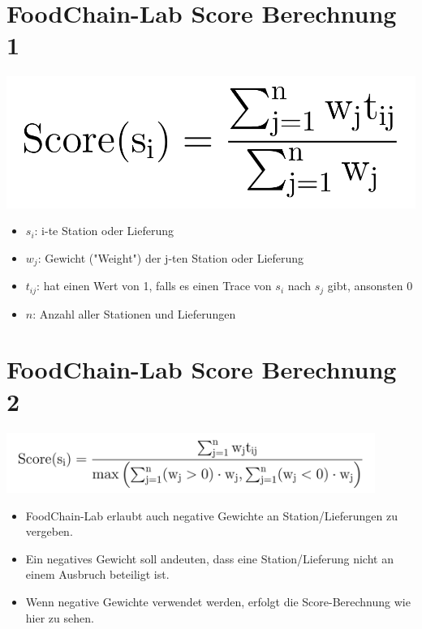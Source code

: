 \documentclass{beamer}
\begin{document}
\section{FoodChain-Lab Score Berechnung 1}
\begin{frame}
	\begin{center}
  		\includegraphics[height=0.3\textheight]{score.png}
	\end{center}
	\begin{itemize}
		\item $s_i$: i-te Station oder Lieferung
		\item $w_j$: Gewicht ("Weight") der j-ten Station oder Lieferung
		\item $t_{ij}$: hat einen Wert von 1, falls es einen Trace von $s_i$ nach $s_j$ gibt, ansonsten 0
		\item $n$: Anzahl aller Stationen und Lieferungen
	\end{itemize}
\end{frame}

\section{FoodChain-Lab Score Berechnung 2}
\begin{frame}
	\begin{center}
  		\includegraphics[width=0.9\textwidth]{new_score.png}
	\end{center}
	\begin{itemize}
		\item FoodChain-Lab erlaubt auch negative Gewichte an Station/Lieferungen zu vergeben.
		\item Ein negatives Gewicht soll andeuten, dass eine Station/Lieferung nicht an einem Ausbruch beteiligt ist.
		\item Wenn negative Gewichte verwendet werden, erfolgt die Score-Berechnung wie hier zu sehen.
	\end{itemize}
\end{frame}
\end{document}
